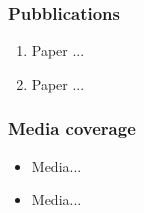 \subsubsection{Pubblications}

\begin{enumerate}
\item Paper ...

\item Paper ...
\end{enumerate}
	
\subsubsection{Media coverage}

\begin{itemize}

\item Media...

\item Media...

\end{itemize}
